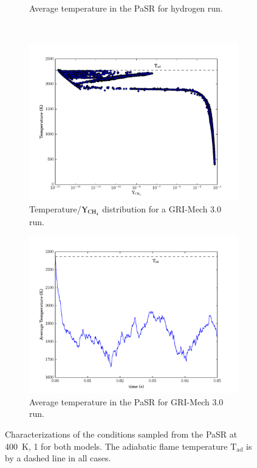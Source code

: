 \documentclass[preprint,review,11pt]{elsarticle}
\begin{document}
\begin{figure}[htbp]
\begin{subfigure}{0.49\textwidth}
      \caption{Average temperature in the PaSR for hydrogen run.}
  \end{subfigure}\\
  \begin{subfigure}{0.49\textwidth}
      \includegraphics[width=\linewidth]{CH4_pasr_dist.pdf}
      \caption{Temperature\slash $\text{Y}_{\text{\ce{CH4}}}$ distribution for a GRI-Mech 3.0 run.}
  \end{subfigure}
  \begin{subfigure}{0.49\textwidth}
      \includegraphics[width=\linewidth]{CH4_pasr_tbar.pdf}
      \caption{Average temperature in the PaSR for GRI-Mech 3.0 run.}
  \end{subfigure}
  \caption{Characterizations of the conditions sampled from the PaSR at \SI{400}{\kelvin}, \SI{1}{\atm} for both models.
  The adiabatic flame temperature $\text{T}_{\text{ad}}$ is by a dashed line in all cases.}
  \label{F:pasr_characterization}
\end{figure}
\end{document}
